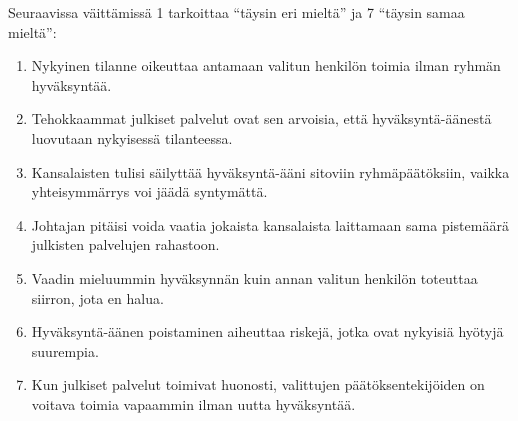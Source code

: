 Seuraavissa väittämissä 1 tarkoittaa ``täysin eri mieltä'' ja 7 ``täysin samaa mieltä'':
\begin{enumerate}[resume]
  \item Nykyinen tilanne oikeuttaa antamaan valitun henkilön toimia ilman ryhmän hyväksyntää.
  \item Tehokkaammat julkiset palvelut ovat sen arvoisia, että hyväksyntä-äänestä luovutaan nykyisessä tilanteessa.
  \item Kansalaisten tulisi säilyttää hyväksyntä-ääni sitoviin ryhmäpäätöksiin, vaikka yhteisymmärrys voi jäädä syntymättä.
  \item Johtajan pitäisi voida vaatia jokaista kansalaista laittamaan sama pistemäärä julkisten palvelujen rahastoon.
  \item Vaadin mieluummin hyväksynnän kuin annan valitun henkilön toteuttaa siirron, jota en halua.
  \item Hyväksyntä-äänen poistaminen aiheuttaa riskejä, jotka ovat nykyisiä hyötyjä suurempia.
  \item Kun julkiset palvelut toimivat huonosti, valittujen päätöksentekijöiden on voitava toimia vapaammin ilman uutta hyväksyntää.
\end{enumerate}

